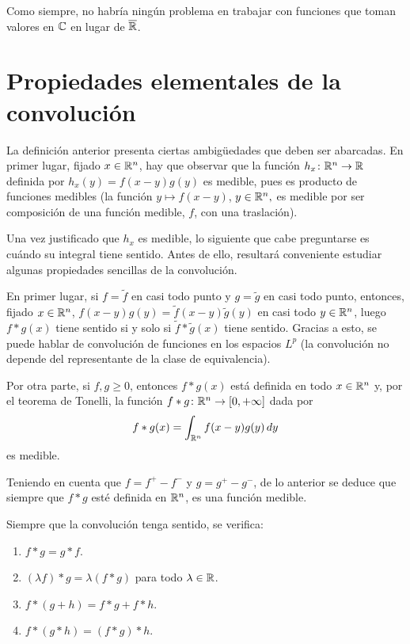 \documentclass[a4paper, 11pt, oneside]{report}
\begin{document}
Como siempre, no habría ningún problema en trabajar con funciones que toman valores en $\mathbb C$ en lugar de $\overline{\mathbb R}$.

\section{Propiedades elementales de la convolución}

La definición anterior presenta ciertas ambigüedades que deben ser abarcadas. En primer lugar, fijado $x \in \mathbb R^n$, hay que observar que la función $h_x \colon \mathbb R^n \to \mathbb R$ definida por $h_x(y) = f(x-y)g(y)$ es medible, pues es producto de funciones medibles (la función $y \mapsto f(x-y)$, $y \in \mathbb R^n,$ es medible por ser composición de una función medible, $f$, con una traslación). 

Una vez justificado que $h_x$ es medible, lo siguiente que cabe preguntarse es cuándo su integral tiene sentido. Antes de ello, resultará conveniente estudiar algunas propiedades sencillas de la convolución.

En primer lugar, si $f = \widetilde{f}$ en casi todo punto y $g = \widetilde{g}$ en casi todo punto, entonces, fijado $x \in \mathbb R^n$, $f(x-y)g(y)=\widetilde{f}(x-y)\widetilde{g}(y)$ en casi todo $y \in \mathbb R^n$, luego $f \ast g (x)$ tiene sentido si y solo si $\widetilde{f} \ast \widetilde{g}(x)$ tiene sentido. Gracias a esto, se puede hablar de convolución de funciones en los espacios $L^p$ (la convolución no depende del representante de la clase de equivalencia).

Por otra parte, si $f,g \geq 0$, entonces $f\ast g (x)$ está definida en todo $x \in \mathbb R^n$ y, por el teorema de Tonelli, la función $f \ast g \colon \mathbb R^n \to [0,+\infty]$ dada por
\[f \ast g(x)=\int_{\mathbb R^n} f(x-y)g(y)\, dy\]
es medible.

Teniendo en cuenta que $f = f^+ - f^-$ y $g = g^+ - g^-$, de lo anterior se deduce que siempre que $f \ast g$ esté definida en $\mathbb R^n$, es una función medible.

\begin{proposition}
  Siempre que la convolución tenga sentido, se verifica:
  \begin{enumerate}
    \item $f \ast g = g \ast f$.
    \item $(\lambda f) \ast g = \lambda (f \ast g)$ para todo $\lambda \in \mathbb R$.
    \item $f \ast (g+h) = f \ast g + f \ast h$.
    \item $f \ast (g \ast h) = (f \ast g) \ast h$.
  \end{enumerate}
\end{proposition}
\end{document}
